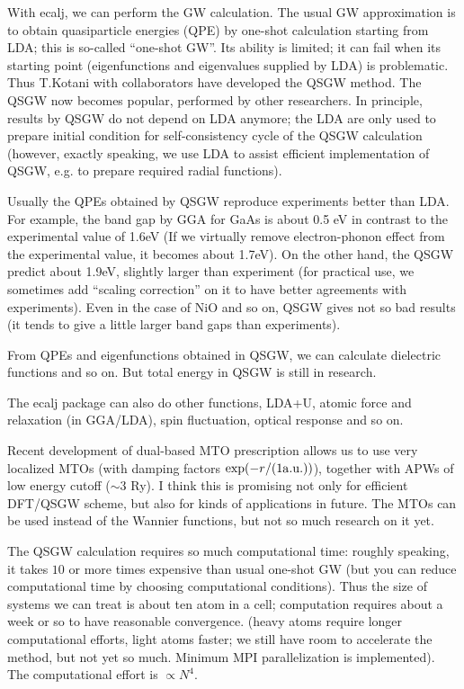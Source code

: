 \documentclass[a4paper,10pt,epsf,fleqn]{article}
\begin{document}
With ecalj, we can perform the GW calculation. 
The usual GW approximation is to obtain
quasiparticle energies (QPE) by one-shot calculation
starting from LDA; this is so-called ``one-shot GW''.
Its ability is limited; it can fail when its starting point 
(eigenfunctions and eigenvalues supplied by LDA) is problematic.
Thus T.Kotani with collaborators have developed the QSGW method. 
The QSGW now becomes popular, performed by other researchers. 
In principle, results by QSGW do not depend on LDA anymore; 
the LDA are only used to prepare initial condition for
self-consistency cycle of the QSGW calculation (however, 
exactly speaking, we use LDA to assist efficient implementation of QSGW,
e.g. to prepare required radial functions). 

Usually the QPEs obtained by QSGW reproduce experiments better than LDA.
For example, the band gap by GGA for GaAs is about 0.5 eV in contrast
to the experimental value of 1.6eV (If we virtually remove electron-phonon
effect from the experimental value, it becomes about 1.7eV). 
On the other hand, the QSGW predict about 1.9eV, slightly larger
than experiment (for practical use, we sometimes add 
``scaling correction'' on it to have better agreements with experiments).
Even in the case of NiO and so on, QSGW gives not so bad results (it
tends to give a little larger band gaps than experiments).

From QPEs and eigenfunctions obtained in QSGW, we can
calculate dielectric functions and so on.
But total energy in QSGW is still in research.

The ecalj package can also do other functions, 
LDA+U, atomic force and relaxation (in GGA/LDA), 
spin fluctuation, optical response and so on.

Recent development of 
dual-based MTO prescription allows us to use very localized MTOs
(with damping factors $\exp(-r/(1{\rm a.u.}))$), together 
with APWs of low energy cutoff ($\sim 3$ Ry). 
I think this is promising not only for efficient DFT/QSGW scheme, 
but also for kinds of applications in future.
The MTOs can be used instead of the Wannier functions,
but not so much research on it yet.

The QSGW calculation requires so much computational time:
roughly speaking, it takes $10$ or more times expensive than usual
one-shot GW (but you can reduce computational time by choosing
computational conditions).
Thus the size of systems we can treat is about ten atom in a cell;
computation requires about a week or so to have reasonable convergence.
(heavy atoms require longer computational efforts,
light atoms faster; we still have room to accelerate the method, but not
yet so much. Minimum MPI parallelization is implemented).
The computational effort is $\propto N^4$.
\end{document}
